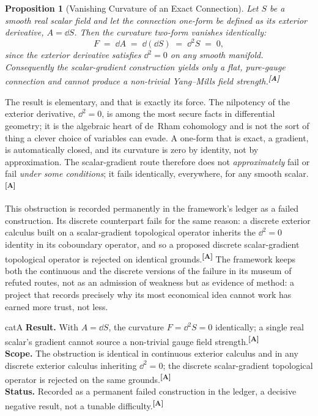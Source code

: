 \documentclass[12pt,a4paper,twoside]{article}
\theoremstyle{plain}
\newtheorem{proposition}[theorem]{Proposition}
\theoremstyle{definition}
\theoremstyle{remark}
\newcommand{\catmark}[1]{\textsuperscript{\textsf{\textbf{[#1]}}}}
\begin{document}
\begin{proposition}[Vanishing Curvature of an Exact Connection]
\label{prop:d2-obstruction}
Let $S$ be a smooth real scalar field and let the connection one-form be defined as its exterior derivative, $A = \dd S$. Then the curvature two-form vanishes identically:
\[
 F \;=\; \dd A \;=\; \dd(\dd S) \;=\; \dd^2 S \;=\; 0,
\]
since the exterior derivative satisfies $\dd^2 = 0$ on any smooth manifold. Consequently the scalar-gradient construction yields only a flat, pure-gauge connection and cannot produce a non-trivial Yang--Mills field strength.\catmark{A}
\end{proposition}

\noindent The result is elementary, and that is exactly its force. The nilpotency of the exterior derivative, $\dd^2 = 0$, is among the most secure facts in differential geometry; it is the algebraic heart of de~Rham cohomology and is not the sort of thing a clever choice of variables can evade. A one-form that is exact, a gradient, is automatically closed, and its curvature is zero by identity, not by approximation. The scalar-gradient route therefore does not \emph{approximately} fail or fail \emph{under some conditions}; it fails identically, everywhere, for any smooth scalar.\catmark{A}

This obstruction is recorded permanently in the framework's ledger as a failed construction. Its discrete counterpart fails for the same reason: a discrete exterior calculus built on a scalar-gradient topological operator inherits the $\dd^2 = 0$ identity in its coboundary operator, and so a proposed discrete scalar-gradient topological operator is rejected on identical grounds.\catmark{A} The framework keeps both the continuous and the discrete versions of the failure in its museum of refuted routes, not as an admission of weakness but as evidence of method: a project that records precisely why its most economical idea cannot work has earned more trust, not less.

\begin{evidencebox}[The $d^2 = 0$ Obstruction]{catA}
\textbf{Result.} With $A = \dd S$, the curvature $F = \dd^2 S = 0$ identically; a single real scalar's gradient cannot source a non-trivial gauge field
strength.\catmark{A}\\[0.3em]
\textbf{Scope.} The obstruction is identical in continuous exterior calculus and in any discrete exterior calculus inheriting $\dd^2 = 0$; the discrete scalar-gradient topological operator is rejected on the same
grounds.\catmark{A}\\[0.3em]
\textbf{Status.} Recorded as a permanent failed construction in the ledger, a decisive negative result, not a tunable difficulty.\catmark{A}
\end{evidencebox}
\end{document}
